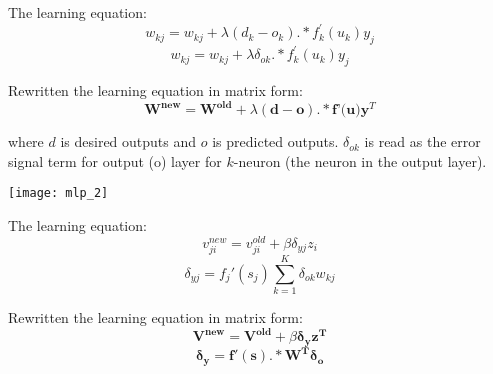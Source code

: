 \begin{multicols}{2}
\noindent The learning equation:
$$w_{kj} = w_{kj} + \lambda (d_k - o_k) .* f_k^{'}(u_k) y_j$$
$$w_{kj} = w_{kj} + \lambda \delta_{ok} .* f_k^{'}(u_k) y_j$$

\noindent Rewritten the learning equation in matrix form:
$$\mathbf{W^{new}} = \mathbf{W^{old}} + \lambda (\mathbf{d}-\mathbf{o}).* \textbf{f'(u)} \mathbf{y}^T$$

\noindent where $d$ is desired outputs and $o$ is predicted outputs. $\delta_{ok}$ is read as the error signal term for output (o) layer for $k$-neuron (the neuron in the output layer). 

\begin{center}
\texttt{[image: mlp\_2]}
\end{center}

\noindent The learning equation:
$$v_{ji}^{new} = v_{ji}^{old} + \beta \delta_{yj} z_i$$
$$\delta_{yj} = f_j'(s_j)\sum_{k=1}^{K} \delta_{ok} w_{kj}$$

\noindent Rewritten the learning equation in matrix form:
$$\mathbf{V^{new} = V^{old}} + \beta \mathbf{\delta_y z^{T}}$$
$$\mathbf{\delta_y = f'(s) .* W^{T} \delta_o}$$

\end{multicols}